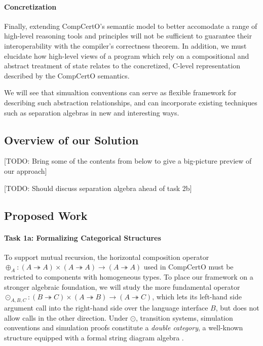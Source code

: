 
\paragraph{Concretization} %

Finally,
extending CompCertO's semantic model
to better accomodate a range of high-level
reasoning tools and principles
will not be sufficient to guarantee their interoperability
with the compiler's correctness theorem.
In addition,
we must elucidate how high-level views of a program
which rely on a compositional and abstract treatment of state
relates to the concretized, C-level representation
described by the CompCertO semantics.

We will see that simualtion conventions
can serve as flexible framework for describing
such abstraction relationships,
and can incorporate existing techniques
such as separation algebras \cite{sepalg}
in new and interesting ways.



\subsection{Overview of our Solution}

[TODO: Bring some of the contents from below to give a big-picture preview
of our approach]

[TODO: Should discuss separation algebra ahead of task 2b]

\subsection{Proposed Work}

\paragraph*{Task 1a: Formalizing Categorical Structures}

To support mutual recursion,
the horizontal composition operator
${\oplus_A} : (A \twoheadrightarrow A) \times (A \twoheadrightarrow A)
  \rightarrow (A \twoheadrightarrow A)$
used in CompCertO
must be restricted to components with homogeneous types.
To place our framework on a stronger algebraic foundation,
we will study the more fundamental operator
${\odot_{A,B,C}} : (B \twoheadrightarrow C) \times (A \twoheadrightarrow B)
  \rightarrow (A \twoheadrightarrow C)$,
which lets its left-hand side argument call into
the right-hand side over the language interface $B$,
but does not allow calls in the other direction.
Under $\odot$,
transition systems, simulation conventions and simulation proofs
constitute a \emph{double category},
a well-known structure equipped with a formal string diagram algebra
\cite{dcsd}.

